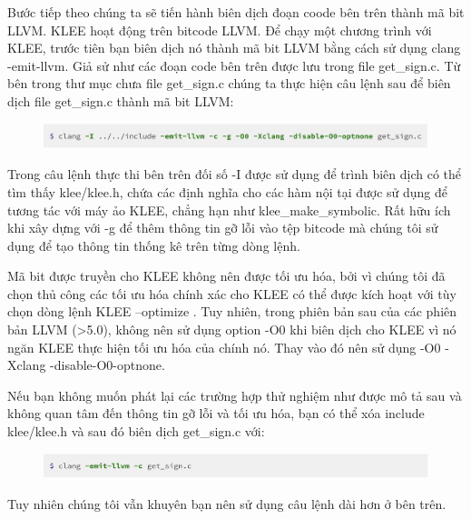 \documentclass[12pt,a4paper]{article}
\begin{document}
Bước tiếp theo chúng ta sẽ tiến hành biên dịch đoạn coode bên trên thành mã bit LLVM. KLEE hoạt động trên bitcode LLVM. Để chạy một chương trình với KLEE, trước tiên bạn biên dịch nó thành mã bit LLVM bằng cách sử dụng clang -emit-llvm. Giả sử như các đoạn code bên trên được lưu trong file get\_sign.c. Từ bên trong thư mục chưa file get\_sign.c chúng ta thực hiện câu lệnh sau để biên dịch file get\_sign.c thành mã bit LLVM:

\begin{figure}[ht]
\begin{center}
\includegraphics[scale=.3]{hinhanh/clangcompiling.png}
\end{center}
\end{figure}

Trong câu lệnh thực thi bên trên đối số -I được sử dụng để trình biên dịch có thể tìm thấy klee/klee.h, chứa các định nghĩa cho các hàm nội tại được sử dụng để tương tác với máy ảo KLEE, chẳng hạn như klee\_make\_symbolic. Rất hữu ích khi xây dựng với -g để thêm thông tin gỡ lỗi vào tệp bitcode mà chúng tôi sử dụng để tạo thông tin thống kê trên từng dòng lệnh.

Mã bit được truyền cho KLEE không nên được tối ưu hóa, bởi vì chúng tôi đã chọn thủ công các tối ưu hóa chính xác cho KLEE có thể được kích hoạt với tùy chọn dòng lệnh KLEE --optimize . Tuy nhiên, trong phiên bản sau của các phiên bản LLVM (>5.0), không nên sử dụng option -O0 khi biên dịch cho KLEE vì nó ngăn KLEE thực hiện tối ưu hóa của chính nó. Thay vào đó nên sử dụng -O0 -Xclang -disable-O0-optnone.

Nếu bạn không muốn phát lại các trường hợp thử nghiệm như được mô tả sau và không quan tâm đến thông tin gỡ lỗi và tối ưu hóa, bạn có thể xóa include klee/klee.h và sau đó biên dịch get\_sign.c với:

\begin{figure}[ht]
\begin{center}
\includegraphics[scale=.3]{hinhanh/clangCompilingshort.png}
\end{center}
\end{figure}

Tuy nhiên chúng tôi vẫn khuyên bạn nên sử dụng câu lệnh dài hơn ở bên trên. \newpage
\end{document}
